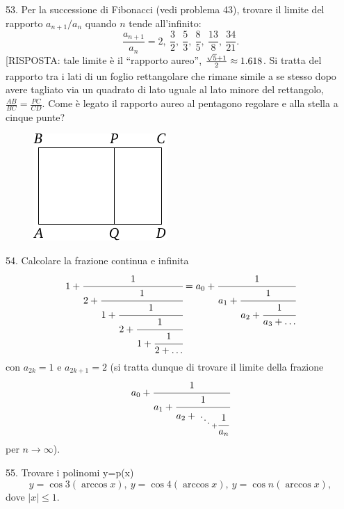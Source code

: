 \begin{problem}{53.}
	Per la successione di Fibonacci (vedi problema 43), trovare il limite del rapporto
	$a_{n+1}/a_n$ quando $n$ tende all’infinito:\vspace{2\jot}
	\begin{equation*}
		\frac{a_{n+1}}{a_n}=2,\ \frac 32,\ \frac53, \ \frac85, \ \frac{13}8,
		\ \frac{34}{21}.
	\end{equation*}
	[RISPOSTA: tale limite è il \enquote{rapporto aureo},
	$\frac{\sqrt{5}+1}{2\vphantom)} \approx 1.618$. Si tratta del rapporto tra i lati di un foglio rettangolare che rimane simile a se stesso dopo avere tagliato via un quadrato di lato uguale al lato minore del rettangolo,
	$\frac{AB}{BC}=\frac{PC}{CD}$. Come è legato il rapporto aureo al pentagono regolare e alla stella a cinque punte?
	\begin{figure}
		\includegraphics{resources/taskbook-37}
	\end{figure}
\end{problem}

\begin{problem}{54.}
Calcolare la frazione continua e infinita
	\begin{equation*}
		1+\cfrac{1}{2+\cfrac{1}{1+\cfrac{1}{2+\cfrac{1}{1+\cfrac{1}{2+\ldots}}}}}=
		a_0+\cfrac{1}{a_1+\cfrac{1}{a_2+\cfrac{1}{a_3+\dots}}}
	\end{equation*}
	con $a_{2k}=1$ e $a_{2k+1}=2$ (si tratta dunque di trovare il limite della frazione
	\begin{equation*}
		a_0+\cfrac{1}{a_1+\cfrac{1}{a_2+{\atop{\ddots \atop {}} + \cfrac{1}{a_n}}}}
	\end{equation*}
	per $n \to \infty$).
\end{problem}

\begin{problem}{55.}
	Trovare i polinomi y=p(x)
	\begin{equation*}
		y=\cos 3 (\arccos x),\ y=\cos 4 (\arccos x),\
		y=\cos n (\arccos x),
	\end{equation*}
	dove $|x| \leqslant 1$.
\end{problem}

